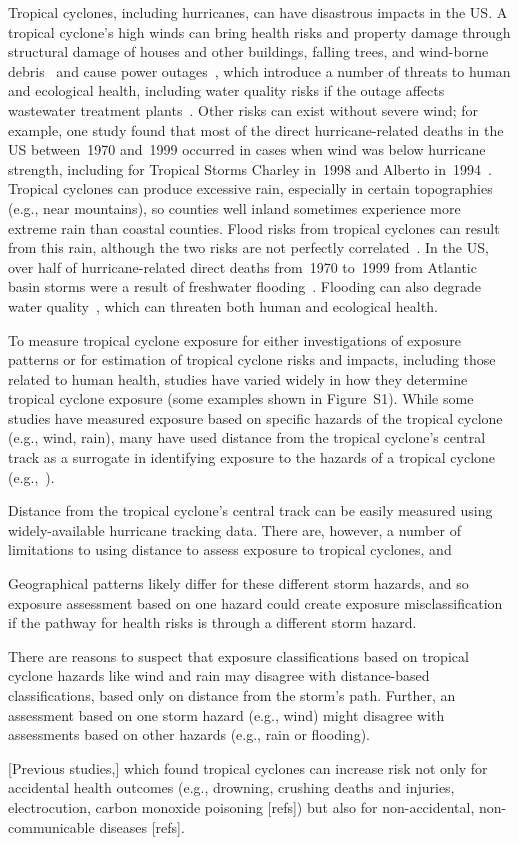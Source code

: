 Tropical cyclones, including hurricanes, can have disastrous impacts in the
\ac{US}. A tropical cyclone's high winds can bring health risks
and property damage through structural damage of houses and other buildings,
falling trees, and wind-borne debris~\parencite{rappaport2000} and cause power
outages~\parencite{liu2005, han2009}, which introduce a number of threats to human
and ecological health, including water quality risks if the outage affects
wastewater treatment plants~\parencite{mallin2006}.  Other risks can exist without
severe wind; for example, one study found that most of the direct
hurricane-related deaths in the \ac{US} between~1970 and~1999 occurred in cases
when wind was below hurricane strength, including for Tropical Storms Charley
in~1998 and Alberto in~1994~\parencite{rappaport2000}.  Tropical cyclones can
produce excessive rain, especially in certain topographies (e.g., near
mountains), so counties well inland sometimes experience more extreme rain than
coastal counties. Flood risks from tropical cyclones can result from this rain,
although the two risks are not perfectly correlated~\parencite{chen2015}. In the
\ac{US}, over half of hurricane-related direct deaths from~1970 to~1999 from
Atlantic basin storms were a result of freshwater flooding~\parencite{rappaport2000}. 
Flooding can also degrade water quality~\parencite{mallin2006}, which can threaten both 
human and ecological health.

To measure tropical cyclone exposure for either investigations of exposure
patterns or for estimation of tropical cyclone risks and impacts, including
those related to human health, studies have varied widely in how they determine
tropical cyclone exposure (some examples shown in Figure~S1). While some
studies have measured exposure based on specific hazards of the tropical
cyclone (e.g., wind, rain), many have used distance from the tropical cyclone's
central track as a surrogate in identifying exposure to the hazards of a
tropical cyclone (e.g.,~\textcite{czajkowski2011, tansel2010, kinney2008,
caillouet2008increase}).  

Distance from the tropical cyclone's central track can be easily measured using
widely-available hurricane tracking data. There are, however, a number of
limitations to using distance to assess exposure to tropical cyclones, and

Geographical patterns likely differ for these different storm hazards, and so
exposure assessment based on one hazard could create exposure misclassification
if the pathway for health risks is through a different storm hazard.  

There are reasons to suspect that
exposure classifications based on tropical cyclone hazards like wind and rain
may disagree with distance-based classifications, based only on distance from
the storm's path. Further, an assessment based on one storm hazard (e.g., wind)
might disagree with assessments based on other hazards (e.g., rain or
flooding).  

[Previous studies,] which found tropical cyclones can increase risk not only
for accidental health outcomes (e.g., drowning, crushing deaths and injuries,
electrocution, carbon monoxide poisoning [refs]) but also for non-accidental,
non-communicable diseases [refs].  


